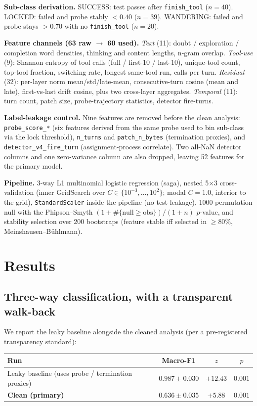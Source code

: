 \documentclass[11pt]{article}
\begin{document}
\textbf{Sub-class derivation.} SUCCESS: test passes after \texttt{finish\_tool} ($n{=}40$). LOCKED: failed and probe stably $<0.40$ ($n{=}39$). WANDERING: failed and probe stays $>0.70$ with no \texttt{finish\_tool} ($n{=}20$).

\textbf{Feature channels (63 raw $\to$ 60 used).} \emph{Text} (11): doubt / exploration / completion word densities, thinking and content lengths, n-gram overlap. \emph{Tool-use} (9): Shannon entropy of tool calls (full / first-10 / last-10), unique-tool count, top-tool fraction, switching rate, longest same-tool run, calls per turn. \emph{Residual} (32): per-layer norm mean/std/late-mean, consecutive-turn cosine (mean and late), first-vs-last drift cosine, plus two cross-layer aggregates. \emph{Temporal} (11): turn count, patch size, probe-trajectory statistics, detector fire-turns.

\textbf{Label-leakage control.} Nine features are removed before the clean analysis: \texttt{probe\_score\_*} (six features derived from the same probe used to bin sub-class via the lock threshold), \texttt{n\_turns} and \texttt{patch\_n\_bytes} (termination proxies), and \texttt{detector\_v4\_fire\_turn} (assignment-process correlate). Two all-NaN detector columns and one zero-variance column are also dropped, leaving 52 features for the primary model.

\textbf{Pipeline.} 3-way L1 multinomial logistic regression (saga), nested 5$\times$3 cross-validation (inner GridSearch over $C\in\{10^{-3},\dots,10^2\}$; modal $C{=}1.0$, interior to the grid), \texttt{StandardScaler} inside the pipeline (no test leakage), 1000-permutation null with the Phipson--Smyth $(1{+}\#\{\text{null}\ge\text{obs}\})/(1{+}n)$ $p$-value, and stability selection over 200 bootstraps (feature stable iff selected in $\ge 80\%$, Meinshausen--B\"uhlmann).

\section{Results}

\subsection{Three-way classification, with a transparent walk-back}

We report the leaky baseline alongside the cleaned analysis (per a pre-registered transparency standard):

\begin{center}
\begin{tabular}{lccc}
\toprule
Run & Macro-F1 & $z$ & $p$ \\
\midrule
Leaky baseline (uses probe / termination proxies) & $0.987\pm0.030$ & $+12.43$ & $0.001$ \\
\textbf{Clean (primary)} & $\mathbf{0.636\pm0.035}$ & $\mathbf{+5.88}$ & $\mathbf{0.001}$ \\
\bottomrule
\end{tabular}
\end{center}
\end{document}
